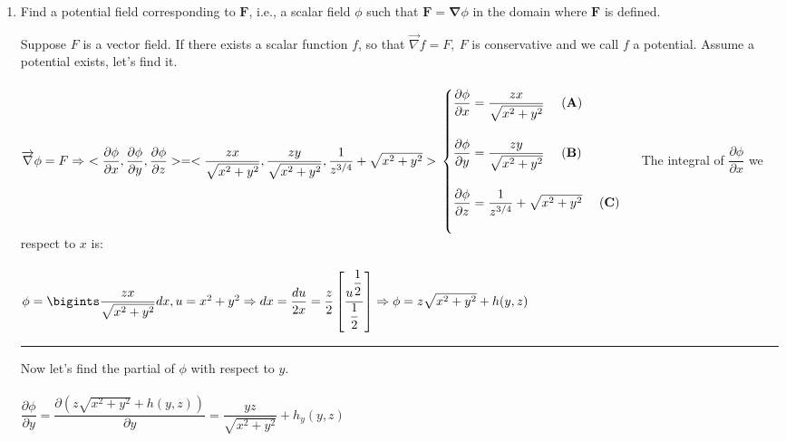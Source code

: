 \documentclass[fleqn]{article}
\begin{document}
\begin{enumerate}
\begin{enumerate}
        \item Find a potential field corresponding to $\mathbf{F}$, i.e., a scalar field $\phi$ such that $\mathbf{F}=\mathbf{\nabla}\phi$ in the domain where $\mathbf{F}$ is defined.

          \textcolor{hwColor}{
            Suppose $F$ is a vector field. If there exists a scalar function $f$, so that $\overrightarrow{\nabla}f=F, ~ F$ is 
            conservative and we call $f$ a potential. Assume a potential exists, let's find it. \\ \\
            $
              \overrightarrow{\nabla} \phi=F \Rightarrow ~ <\dfrac{\partial \phi}{\partial x}, \dfrac{\partial \phi}{\partial y}, \dfrac{\partial \phi}{\partial z}>=<\dfrac{zx}{\sqrt{x^2+y^2}}, \dfrac{zy}{\sqrt{x^2+y^2}}, \dfrac{1}{z^{3/4}}+\sqrt{x^2+y^2}> \\ 
              \\
              \begin{cases}
                \dfrac{\partial \phi}{\partial x}=\dfrac{zx}{\sqrt{x^2+y^2}} ~~~~ \mathbf{(A)}\\
                \\
                \dfrac{\partial \phi}{\partial y}=\dfrac{zy}{\sqrt{x^2+y^2}} ~~~~ \mathbf{(B)}\\
                \\
                \dfrac{\partial \phi}{\partial z}=\dfrac{1}{z^{3/4}}+\sqrt{x^2+y^2} ~~~~ \mathbf{(C)}\\ \\
              \end{cases} \\
            $
            The integral of $\dfrac{\partial \phi}{\partial x}$ we respect to $x$ is: \\ \\
            $
              \phi=\bigints \dfrac{zx}{\sqrt{x^2+y^2}} dx, u=x^2+y^2 \Rightarrow dx=\dfrac{du}{2x} \\
              \\
              =\dfrac{z}{2} \left[\dfrac{u^{\dfrac{1}{2}}}{\dfrac{1}{2}}\right] \Rightarrow \phi=z\sqrt{x^2+y^2}+h(y,z) \\ \\
            $
            \rule{15cm}{1pt}
            Now let's find the partial of $\phi$ with respect to $y$. \\
            \\
            $\dfrac{\partial \phi}{\partial y}=\dfrac{\partial (z\sqrt{x^2+y^2}+h(y,z))}{\partial y}=\dfrac{yz}{\sqrt{x^2+y^2}}+h_y(y,z)$ \\ \\
}
\end{enumerate}
\end{enumerate}
\end{document}
